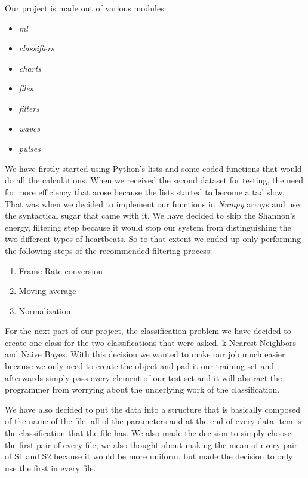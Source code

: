 \documentclass[conference]{IEEEtran}
\begin{document}
Our project is made out of various modules:
\begin{itemize}
	\item \textit{ml}
	\item \textit{classifiers}
	\item \textit{charts}
	\item \textit{files}
	\item \textit{filters}
	\item \textit{waves}
	\item \textit{pulses}
\end{itemize}

We have firstly started using Python's lists and some coded functions that would
do all the calculations. When we received the second dataset for testing, the
need for more efficiency that arose because the lists started to become a tad
slow. That was when we decided to implement our functions in \textit{Numpy}
arrays and use the syntactical sugar that came with it. We have decided to
skip the Shannon's energy, filtering step because it would stop our system from
distinguishing the two different types of heartbeats. So to that extent we
ended up only performing the following steps of the recommended filtering
process:
\begin{enumerate}
	\item Frame Rate conversion
	\item Moving average
	\item Normalization
\end{enumerate}

For the next part of our project, the classification problem we have decided to
create one class for the two classifications that were asked, k-Nearest-Neighbors
and Naive Bayes. With this decision we wanted to make our job much easier
because we only need to create the object and pad it our training set and
afterwards simply pass every element of our test set and it will abstract the
programmer from worrying about the underlying work of the classification.

We have also decided to put the data into a structure that is basically composed
of the name of the file, all of the parameters and at the end of every data
item is the classification that the file has. We also made the decision to
simply choose the first pair of every file, we also thought about making the
mean of every pair of S1 and S2 because it would be more uniform, but made the
decision to only use the first in every file.
\end{document}
